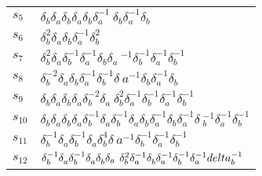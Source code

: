 \documentclass{article}
\begin{document}
\begin{center}
\begin{tabular}{ll}
$s_{5}$ & $\delta_b^{}\delta_a^{}\delta_b^{}\delta_a^{}\delta_b^{}\delta_a^{-1}\
\delta_b^{}\delta_a^{-1}\delta_b^{}$ \\
$s_{6}$ & $\delta_b^{2}\delta_a^{}\delta_b^{}\delta_a^{-1}\delta_b^{2}$ \\
$s_{7}$ & $\delta_b^{2}\delta_a^{}\delta_b^{-1}\delta_a^{-1}\delta_b^{}\delta_a\
^{-1}\delta_b^{-1}\delta_a^{-1}\delta_b^{-1}$ \\
$s_{8}$ & $\delta_b^{-2}\delta_a^{}\delta_b^{}\delta_a^{-1}\delta_b^{-1}\delta_\
a^{-1}\delta_b^{}\delta_a^{-1}\delta_b^{}$ \\
$s_{9}$ & $\delta_b^{}\delta_a^{}\delta_b^{}\delta_a^{}\delta_b^{-2}\delta_a^{}\
\delta_b^{2}\delta_a^{-1}\delta_b^{-1}\delta_a^{-1}\delta_b^{-1}$ \\
$s_{10}$ & $\delta_b^{}\delta_a^{}\delta_b^{}\delta_a^{}\delta_b^{-1}\delta_a^{\
}\delta_b^{-1}\delta_a^{}\delta_b^{}\delta_a^{-1}\delta_b^{}\delta_a^{-1}\delta\
_b^{-1}\delta_a^{-1}\delta_b^{-1}$ \\
$s_{11}$ & $\delta_b^{-1}\delta_a^{}\delta_b^{-1}\delta_a^{}\delta_b^{4}\delta_\
a^{-1}\delta_b^{-1}\delta_a^{-1}\delta_b^{-1}$ \\
$s_{12}$ & $\delta_b^{-1}\delta_a^{}\delta_b^{-1}\delta_a^{}\delta_b^{}\delta_a\
^{}\delta_b^{2}\delta_a^{-1}\delta_b^{}\delta_a^{-1}\delta_b^{-1}\delta_a^{-1}\\
delta_b^{-1}$ \\
\bottomrule
\end{tabular}
\end{center}

\thispagestyle{empty}
\end{document}
